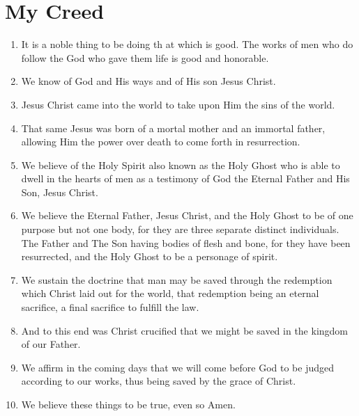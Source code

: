 \section{My Creed}
\begin{enumerate}
\item It is a noble thing to be doing th at which is good. 
The works of men who do follow the God who gave them life is good 
and honorable.

\item We know of God and His ways and of His son Jesus Christ.

\item Jesus Christ came into the world to take upon Him the sins of the world.

\item  That same Jesus was born of a mortal mother and an immortal father, 
allowing Him the power over death to come forth in resurrection.

\item We believe of the Holy Spirit also known as the Holy Ghost who is 
able to dwell in the hearts of men as a testimony of God the Eternal Father 
and His Son, Jesus Christ.

\item We believe the Eternal Father, Jesus Christ, and the Holy Ghost to be of 
one purpose but not one body, for they are three separate distinct individuals. 
The Father and The Son having bodies of flesh and bone, for they have been 
resurrected, and the Holy Ghost to be a personage of spirit.

\item We sustain the doctrine that man may be saved through the redemption 
which Christ laid out for the world, that redemption being an eternal sacrifice, 
a final sacrifice to fulfill the law.

\item And to this end was Christ crucified that we might be saved in the 
kingdom of our Father.

\item We affirm in the coming days that we will come before God to be 
judged according to our works, thus being saved by the grace of Christ.

\item We believe these things to be true, even so Amen.
\end{enumerate}